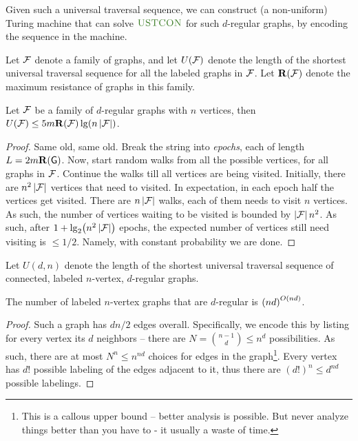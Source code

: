 Given such a universal traversal sequence, we can construct (a
non-uniform) Turing machine that can solve $\USTCON$ for such
$d$-regular graphs, by encoding the sequence in the machine.

Let $\mathcal{F}$ denote a family of graphs, and let $U(\mathcal{F})$ denote
the length of the shortest universal traversal sequence for all the
labeled graphs in $\mathcal{F}$. Let $\mathbf{R}(\mathcal{F})$ denote the
maximum resistance of graphs in this family.

\begin{theorem}
    Let $\mathcal{F}$ be a family of $d$-regular graphs with $n$ vertices,
    then
    $U(\Family) \leq 5 m \Resistance(\Family) \lg \pth{ n
       \cardin{\Family}}$.
\end{theorem}
\begin{proof} 
    Same old, same old.  Break the string into \emph{epochs}, each of
    length $L = 2 m \mathbf{R}(\mathsf{G})$. Now, start random walks from
    all the possible vertices, for all graphs in $\mathcal{F}$. Continue
    the walks till all vertices are being visited. Initially, there
    are $n^2 \left| {\mathcal{F}} \right|$ vertices that need to visited. In
    expectation, in each epoch half the vertices get visited.  There
    are $n \left| {\mathcal{F}} \right|$ walks, each of them needs to visit $n$
    vertices. As such, the number of vertices waiting to be visited is
    bounded by $\left| {\mathcal{F}} \right| n^2$.  As such, after
    $1 + \lg_2 \pth[]{ n^2\cardin{\Family} }$ epochs, the expected
    number of vertices still need visiting is $\leq 1/2$. Namely, with
    constant probability we are done.
\end{proof}


Let $U(d,n)$ denote the length of the shortest universal traversal
sequence of connected, labeled $n$-vertex, $d$-regular graphs.

\begin{lemma}
    The number of labeled $n$-vertex graphs that are $d$-regular is
    $\pth[]{nd}^{O(nd)}$.
\end{lemma}
\begin{proof}
    Such a graph has $dn/2$ edges overall. Specifically, we encode
    this by listing for every vertex its $d$ neighbors -- there are
    $N = \binom{n-1}{d} \leq n^d$ possibilities. As such, there are at
    most $ N^n \leq n^{nd}$ choices for edges in the
    graph\footnote{This is a callous upper bound -- better analysis is
       possible. But never analyze things better than you have to - it
       usually a waste of time.}.  Every vertex has $d!$ possible
    labeling of the edges adjacent to it, thus there are
    $(d!)^n \leq d^{nd }$ possible labelings.
\end{proof}

